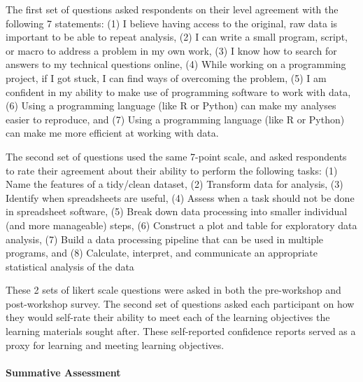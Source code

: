 \documentclass[030-workshop.tex]{subfiles}
\begin{document}
          The first set of questions asked respondents on their level agreement with the following 7 statements:
          (1) I believe having access to the original, raw data is important to be able to repeat analysis,
          (2) I can write a small program, script, or macro to address a problem in my own work,
          (3) I know how to search for answers to my technical questions online,
          (4) While working on a programming project, if I got stuck, I can find ways of overcoming the problem,
          (5) I am confident in my ability to make use of programming software to work with data,
          (6) Using a programming language (like R or Python) can make my analyses easier to reproduce, and
          (7) Using a programming language (like R or Python) can make me more efficient at working with data.

          The second set of questions used the same 7-point scale,
          and asked respondents to rate their agreement about their ability to perform the following tasks:
          (1) Name the features of a tidy/clean dataset,
          (2) Transform data for analysis,
          (3) Identify when spreadsheets are useful,
          (4) Assess when a task should not be done in spreadsheet software,
          (5) Break down data processing into smaller individual (and more manageable) steps,
          (6) Construct a plot and table for exploratory data analysis,
          (7) Build a data processing pipeline that can be used in multiple programs, and
          (8) Calculate, interpret, and communicate an appropriate statistical analysis of the data

          These 2 sets of likert scale questions were asked in both the pre-workshop and post-workshop survey.
          The second set of questions asked each participant on how they would self-rate their ability
          to meet each of the learning objectives the learning materials sought after.
          These self-reported confidence reports served as a proxy for learning and meeting learning objectives.

      \paragraph{Summative Assessment}
\end{document}
